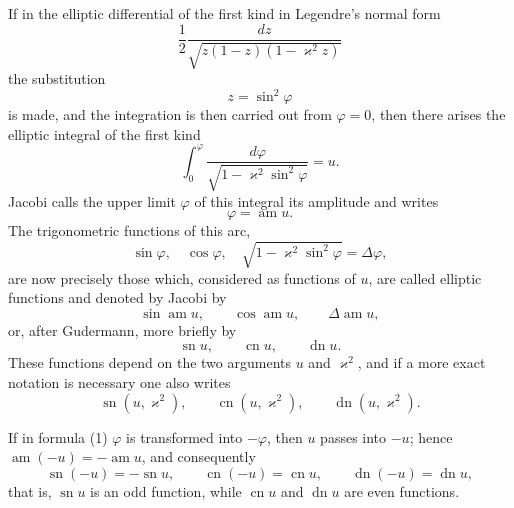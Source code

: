 \documentclass[11pt]{article}
\begin{document}
If in the elliptic differential of the first kind in Legendre's normal form
\[
\frac12\frac{dz}{\sqrt{z(1-z)(1-\varkappa^2z)}}
\]
the substitution
\begin{equation}
z=\sin^2\varphi
\tag{1}
\end{equation}
is made, and the integration is then carried out from $\varphi=0$, then there arises the elliptic integral of the first kind
\begin{equation}
\int_0^\varphi\frac{d\varphi}{\sqrt{1-\varkappa^2\sin^2\varphi}}=u.
\tag{2}
\end{equation}
Jacobi calls the upper limit $\varphi$ of this integral its amplitude and writes
\begin{equation}
\varphi=\operatorname{am}u.
\tag{3}
\end{equation}
The trigonometric functions of this arc,
\begin{equation}
\sin\varphi,\quad \cos\varphi,\quad
\sqrt{1-\varkappa^2\sin^2\varphi}=\Delta\varphi,
\tag{4}
\end{equation}
are now precisely those which, considered as functions of $u$, are called elliptic functions and denoted by Jacobi by
\[
\sin\operatorname{am}u,\qquad \cos\operatorname{am}u,\qquad \Delta\operatorname{am}u,
\]
or, after Gudermann, more briefly by
\begin{equation}
\operatorname{sn}u,\qquad \operatorname{cn}u,\qquad \operatorname{dn}u.
\tag{5}
\end{equation}
These functions depend on the two arguments $u$ and $\varkappa^2$, and if a more exact notation is necessary one also writes
\[
\operatorname{sn}(u,\varkappa^2),\qquad
\operatorname{cn}(u,\varkappa^2),\qquad
\operatorname{dn}(u,\varkappa^2).
\]

If in formula (1) $\varphi$ is transformed into $-\varphi$, then $u$ passes into $-u$; hence $\operatorname{am}(-u)=-\operatorname{am}u$, and consequently
\[
\operatorname{sn}(-u)=-\operatorname{sn}u,\qquad
\operatorname{cn}(-u)=\operatorname{cn}u,\qquad
\operatorname{dn}(-u)=\operatorname{dn}u,
\]
that is, $\operatorname{sn}u$ is an odd function, while $\operatorname{cn}u$ and $\operatorname{dn}u$ are even functions.
\end{document}
